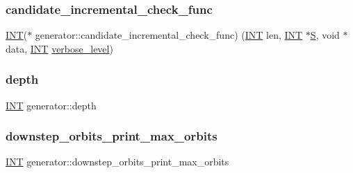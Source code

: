 \mbox{\label{classgenerator_abb2be54d4384c500bf4e6556a5b990da}} 
\subsubsection{\texorpdfstring{candidate\+\_\+incremental\+\_\+check\+\_\+func}{candidate\_incremental\_check\_func}}
{\footnotesize\ttfamily \mbox{\hyperlink{galois_8h_a09fddde158a3a20bd2dcadb609de11dc}{I\+NT}}($\ast$ generator\+::candidate\+\_\+incremental\+\_\+check\+\_\+func) (\mbox{\hyperlink{galois_8h_a09fddde158a3a20bd2dcadb609de11dc}{I\+NT}} len, \mbox{\hyperlink{galois_8h_a09fddde158a3a20bd2dcadb609de11dc}{I\+NT}} $\ast$\mbox{\hyperlink{classgenerator_a5d2b65e2bd0e451744af1a47ba00bd96}{S}}, void $\ast$data, \mbox{\hyperlink{galois_8h_a09fddde158a3a20bd2dcadb609de11dc}{I\+NT}} \mbox{\hyperlink{classgenerator_a7fedc6488314cbc00dbfcc42d311e1ce}{verbose\+\_\+level}})}

\mbox{\label{classgenerator_a2560425547ee25a53b8a184aecc0d23e}} 
\subsubsection{\texorpdfstring{depth}{depth}}
{\footnotesize\ttfamily \mbox{\hyperlink{galois_8h_a09fddde158a3a20bd2dcadb609de11dc}{I\+NT}} generator\+::depth}

\mbox{\label{classgenerator_ad7726162bdeb8c0ea0b4ac1cffcadc08}} 
\subsubsection{\texorpdfstring{downstep\+\_\+orbits\+\_\+print\+\_\+max\+\_\+orbits}{downstep\_orbits\_print\_max\_orbits}}
{\footnotesize\ttfamily \mbox{\hyperlink{galois_8h_a09fddde158a3a20bd2dcadb609de11dc}{I\+NT}} generator\+::downstep\+\_\+orbits\+\_\+print\+\_\+max\+\_\+orbits}

